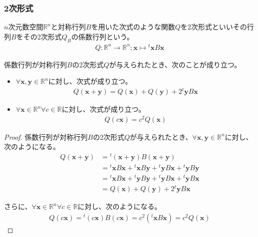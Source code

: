 \documentclass[dvipdfmx]{jsarticle}
\begin{document}
\subsubsection{2次形式}%
\begin{dfn}
$n$次元数空間$\mathbb{R}^{n}$と対称行列$B$を用いた次式のような関数$Q$を2次形式といいその行列$B$をその2次形式$Q_{B}$の係数行列という。
\begin{align*}
Q:\mathbb{R}^{n} \rightarrow \mathbb{R}^{n};\mathbf{x} \mapsto {}^t \mathbf{x}B\mathbf{x} 
\end{align*}
\end{dfn}
\begin{thm}\label{4.4.3.3}
係数行列が対称行列$B$の2次形式$Q$が与えられたとき、次のことが成り立つ。
\begin{itemize}
\item
  $\forall\mathbf{x},\mathbf{y} \in \mathbb{R}^{n}$に対し、次式が成り立つ。
\begin{align*}
Q\left( \mathbf{x} + \mathbf{y} \right) = Q\left( \mathbf{x} \right) + Q\left( \mathbf{y} \right) + 2{}^t \mathbf{y}B\mathbf{x}
\end{align*}
\item
  $\forall\mathbf{x} \in \mathbb{R}^{n}\forall c \in \mathbb{R}$に対し、次式が成り立つ。
\begin{align*}
Q\left( c\mathbf{x} \right) = c^{2}Q\left( \mathbf{x} \right)
\end{align*}
\end{itemize}
\end{thm}
\begin{proof}
係数行列が対称行列$B$の2次形式$Q$が与えられたとき、$\forall\mathbf{x},\mathbf{y} \in \mathbb{R}^{n}$に対し、次のようになる。
\begin{align*}
Q\left( \mathbf{x} + \mathbf{y} \right) &={}^t \left( \mathbf{x} + \mathbf{y} \right)B\left( \mathbf{x} + \mathbf{y} \right)\\
&={}^t \mathbf{x}B\mathbf{x} +{}^t \mathbf{x}B\mathbf{y} +{}^t \mathbf{y}B\mathbf{x} +{}^t \mathbf{y}B\mathbf{y}\\
&={}^t \mathbf{x}B\mathbf{x} +{}^t \mathbf{y}B\mathbf{y} +{}^t \mathbf{y}B\mathbf{x} +{}^t \mathbf{y}B\mathbf{x}\\
&= Q\left( \mathbf{x} \right) + Q\left( \mathbf{y} \right) + 2{}^t \mathbf{y}B\mathbf{x}
\end{align*}\par
さらに、$\forall\mathbf{x} \in \mathbb{R}^{n}\forall c \in \mathbb{R}$に対し、次のようになる。
\begin{align*}
Q\left( c\mathbf{x} \right) ={}^t \left( c\mathbf{x} \right)B\left( c\mathbf{x} \right) = c^{2}\left({}^t \mathbf{x}B\mathbf{x} \right) = c^{2}Q\left( \mathbf{x} \right)
\end{align*}
\end{proof}
\end{document}
